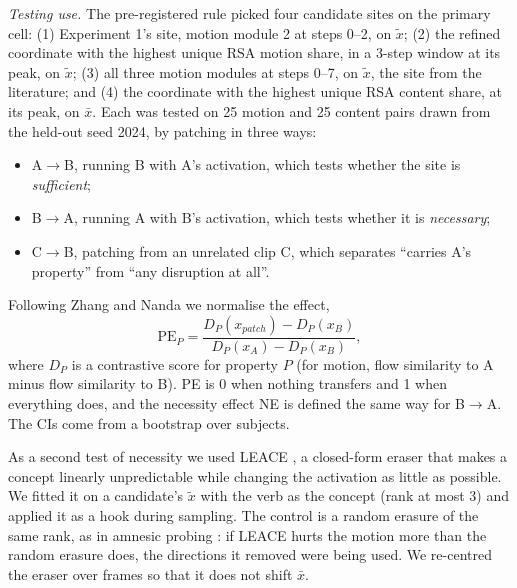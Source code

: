 \documentclass[twoside,english]{article}
\newcommand{\xs}{\bar{x}}         %
\newcommand{\xd}{\tilde{x}}       %
\begin{document}
\emph{Testing use.} The pre-registered rule picked four candidate sites on the primary cell:
(1) Experiment 1's site,  motion module 2 at steps 0--2, on $\xd$; (2) the refined
coordinate with the highest unique RSA motion share, in a 3-step window at its peak, on $\xd$; (3) all
three  motion modules at steps 0--7, on $\xd$, the site from the literature; and
(4) the coordinate with the highest unique RSA content share, at its peak, on $\xs$. Each was tested on
25 motion and 25 content pairs drawn from the held-out seed 2024, by patching in three ways:
\begin{itemize}
\item A$\to$B, running B with A's activation, which tests whether the site is \emph{sufficient};
\item B$\to$A, running A with B's activation, which tests whether it is \emph{necessary};
\item C$\to$B, patching from an unrelated clip C, which separates ``carries A's property'' from
  ``any disruption at all''.
\end{itemize}
Following Zhang and Nanda \citep{zhang2024patching} we normalise the effect,
\begin{equation}
\mathrm{PE}_P = \frac{D_P(x_{patch}) - D_P(x_B)}{D_P(x_A) - D_P(x_B)},
\end{equation}
where $D_P$ is a contrastive score for property $P$ (for motion, flow similarity to A minus flow
similarity to B). PE is 0 when nothing transfers and 1 when everything does, and the necessity effect
NE is defined the same way for B$\to$A. The CIs come from a bootstrap over subjects.

As a second test of necessity we used LEACE \citep{belrose2023leace}, a closed-form eraser that makes a
concept linearly unpredictable while changing the activation as little as possible. We fitted it on a
candidate's $\xd$ with the verb as the concept (rank at most 3) and applied it as a hook during
sampling. The control is a random erasure of the same rank, as in amnesic probing
\citep{elazar2021amnesic}: if LEACE hurts the motion more than the random erasure does, the directions
it removed were being used. We re-centred the eraser over frames so that it does not shift $\xs$.
\end{document}
